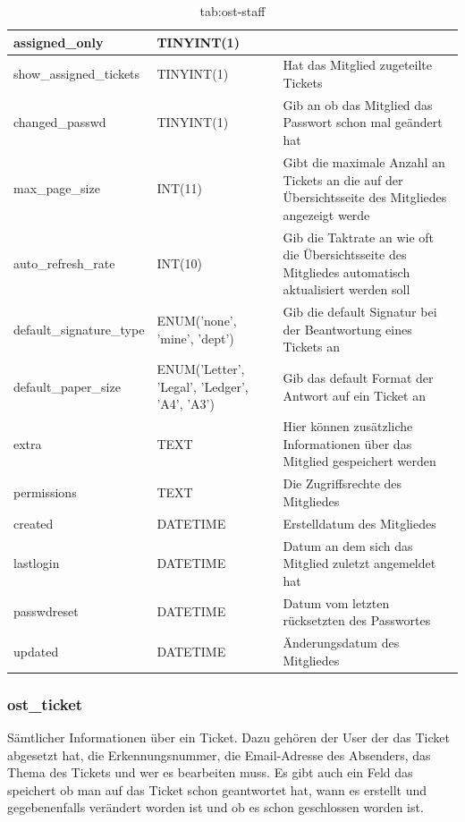\begin{table}[]
\begin{tabular}{|p{3.5cm}|p{4cm}|p{7.2cm}|}
		\hline
		assigned\_only & TINYINT(1) & \\
		\hline
		show\_assigned\_tickets & TINYINT(1) & Hat das Mitglied zugeteilte Tickets \\
		\hline
		changed\_passwd & TINYINT(1) & Gib an ob das Mitglied das Passwort schon mal geändert hat\\
		\hline
		max\_page\_size & INT(11) & Gibt die maximale Anzahl an Tickets an die auf der Übersichtsseite des Mitgliedes angezeigt werde \\
		\hline
		auto\_refresh\_rate & INT(10) & Gib die Taktrate an wie oft die Übersichtsseite des Mitgliedes automatisch aktualisiert werden soll \\
		\hline
		default\_signature\_type & ENUM('none', 'mine', 'dept') & Gib die default Signatur bei der Beantwortung eines Tickets an \\
		\hline
		default\_paper\_size & ENUM('Letter', 'Legal', 'Ledger', 'A4', 'A3') & Gib das default Format der Antwort auf ein Ticket an \\
		\hline
		extra & TEXT & Hier können zusätzliche Informationen über das Mitglied gespeichert werden \\
		\hline
		permissions & TEXT & Die Zugriffsrechte des Mitgliedes \\
		\hline
		created & DATETIME & Erstelldatum des Mitgliedes \\
		\hline
		lastlogin & DATETIME & Datum an dem sich das Mitglied zuletzt angemeldet hat \\
		\hline
		passwdreset & DATETIME & Datum vom letzten rücksetzten des Passwortes \\
		\hline
		updated & DATETIME & Änderungsdatum des Mitgliedes \\
		\hline
	\end{tabular}
	\caption{tab:ost-staff}
\end{table}
\label{tab:ost_staff}


\newpage
\subsubsection{ost\_ticket}

Sämtlicher Informationen über ein Ticket. Dazu gehören der User der das Ticket abgesetzt hat, die Erkennungsnummer, die Email-Adresse des Absenders, das Thema des Tickets und wer es bearbeiten muss. Es gibt auch ein Feld das speichert ob man auf das Ticket schon geantwortet hat, wann es erstellt und gegebenenfalls verändert worden ist und ob es schon geschlossen worden ist.



